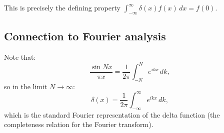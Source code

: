 \documentclass[12pt]{article}
\begin{document}
This is precisely the defining property $\int_{-\infty}^{\infty}\delta(x)f(x)\,dx = f(0)$.

\subsection*{Connection to Fourier analysis}

Note that:
\[
\frac{\sin Nx}{\pi x} = \frac{1}{2\pi}\int_{-N}^{N}e^{ikx}\,dk,
\]
so in the limit $N \to \infty$:
\[
\delta(x) = \frac{1}{2\pi}\int_{-\infty}^{\infty}e^{ikx}\,dk,
\]
which is the standard Fourier representation of the delta function (the completeness relation for the Fourier transform).
\end{document}
